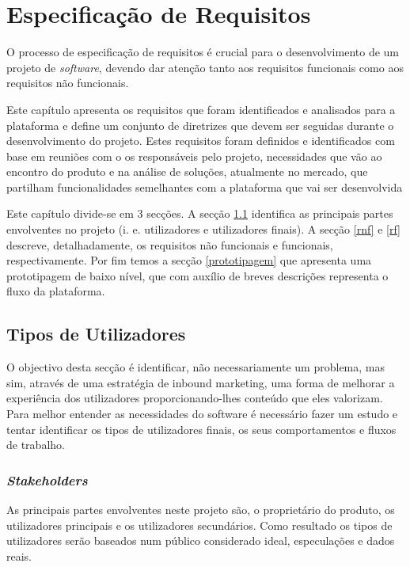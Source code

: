 \chapter{Especificação de Requisitos}
\label{sec:requisitos}

O processo de especificação de requisitos é crucial para o desenvolvimento de um projeto de \textit{software}, devendo dar atenção tanto aos requisitos funcionais como aos requisitos não funcionais.

Este capítulo apresenta os requisitos que foram identificados e analisados para a plataforma e define um conjunto de diretrizes que devem ser seguidas durante o desenvolvimento do projeto. Estes requisitos foram definidos e identificados com base em reuniões com o os responsáveis pelo projeto, necessidades que vão ao encontro do produto e na análise de soluções, atualmente no mercado, que partilham funcionalidades semelhantes com a plataforma que vai ser desenvolvida

Este capítulo divide-se em 3 secções. A secção \ref{requisitos:tiposutilizadores} identifica as principais partes envolventes no projeto (i. e. utilizadores e utilizadores finais). A secção \ref{rnf} e \ref{rf} descreve, detalhadamente, os requisitos não funcionais e funcionais, respectivamente. Por fim temos a secção \ref{prototipagem} que apresenta uma prototipagem de baixo nível, que com auxílio de breves descrições representa o fluxo da plataforma.


\section{Tipos de Utilizadores}
\label{requisitos:tiposutilizadores}

O objectivo desta secção é identificar, não necessariamente um problema, mas sim, através de uma estratégia de inbound marketing, uma forma de melhorar a experiência dos utilizadores proporcionando-lhes conteúdo que eles valorizam. Para melhor entender as necessidades do software é necessário fazer um estudo e tentar identificar os tipos de utilizadores finais, os seus comportamentos e fluxos de trabalho.


\subsection{\textit{Stakeholders}}

As principais partes envolventes neste projeto são, o proprietário do produto, os utilizadores principais e os utilizadores secundários. Como resultado os tipos de utilizadores serão baseados num público considerado  ideal, especulações e dados reais.


